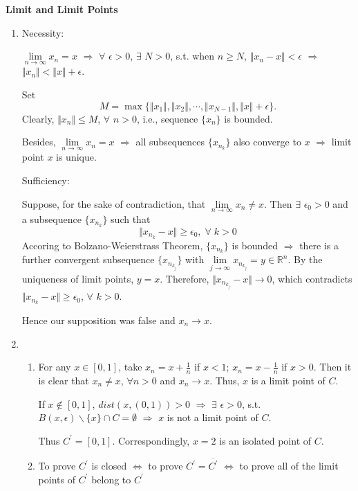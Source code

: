 \documentclass[11pt,letter,notitlepage]{article}
\theoremstyle{definition}
\begin{document}
\newpage

\begin{solution} \textbf{Limit and Limit Points}
\begin{enumerate}
\item {}Necessity:

$\lim\limits_{n\to\infty}x_n = x$ $\Longrightarrow$ $\forall$ $\epsilon>0$, $\exists$ $N>0$, s.t. when $n \geq N$, $\Vert x_n-x\Vert < \epsilon$ $\Longrightarrow$ $\Vert x_n \Vert < \Vert x \Vert + \epsilon$.

Set
\[
M = \max\{\Vert x_1 \Vert, \Vert x_2 \Vert, \cdots, \Vert x_{N-1} \Vert, \Vert x \Vert+\epsilon\}.
\]
Clearly, $\Vert x_n \Vert \leq M$, $\forall$ $n > 0$, i.e., sequence $\{x_n\}$ is bounded.

Besides, $\lim\limits_{n\to \infty} x_n = x$ $\Longrightarrow$ all subsequences $\{x_{n_k}\}$ also converge to $x$ $\Longrightarrow$ limit point $x$ is unique.

Sufficiency:

Suppose, for the sake of contradiction, that $\lim\limits_{n \to \infty}x_n \neq x$. Then $\exists$ $\epsilon_0 > 0$ and a subsequence $\{x_{n_k}\}$ such that
\[
\Vert x_{n_k} - x \Vert \geq \epsilon_0,\;\forall\;k > 0
\]
Accoring to Bolzano-Weierstrass Theorem, $\{x_{n_k}\}$ is bounded $\Longrightarrow$ there is a further convergent subsequence $\{x_{n_{k_j}}\}$ with $\lim\limits_{j\to\infty} x_{n_{k_{j}}} = y \in \mathbb{R}^n$. By the uniqueness of limit points, $y = x$. Therefore, $\Vert x_{n_{k_j}} - x \Vert \rightarrow 0$, which contradicts $\Vert x_{n_k} - x \Vert \geq \epsilon_0$, $\forall$ $k > 0$.

Hence our supposition was false and $x_n \rightarrow x$.
\item
\begin{enumerate}
	\item For any $x \in [0,1]$, take $x_n = x+\frac{1}{n}$ if $x < 1$; $x_n = x - \frac{1}{n}$ if $x > 0$. Then it is clear that $x_n \neq x$, $\forall n >0 $ and $x_n \rightarrow x$. Thus, $x$ is a limit point of $C$.
	
	If $x\notin [0,1]$, $dist(x,(0,1)) > 0$ $\Longrightarrow$ $\exists$ $\epsilon > 0$, s.t. $B(x,\epsilon)\backslash\{x\} \cap C = \emptyset$ $\Longrightarrow$ $x$ is not a limit point of $C$.

	Thus $C^{\prime} = [0,1]$. Correspondingly, $x=2$ is an isolated point of $C$.
	\item To prove $C^{\prime}$ is closed $\Longleftrightarrow$ to prove $C^{\prime} = \overline{C^{\prime}}$ $\Longleftrightarrow$ to prove all of the limit points of $C^{\prime}$ belong to $C^{\prime}$
	

\end{enumerate}
\end{enumerate}
\end{solution}
\end{document}

